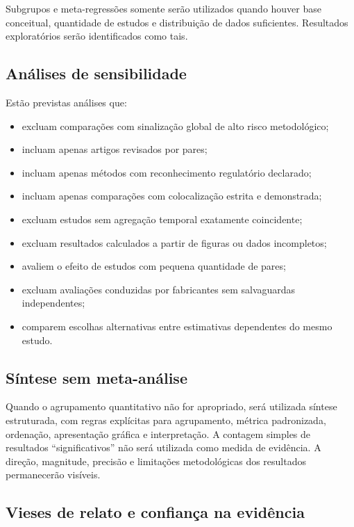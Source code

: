 \documentclass[11pt,a4paper]{article}
\begin{document}
Subgrupos e meta-regressões somente serão utilizados quando houver base conceitual,
quantidade de estudos e distribuição de dados suficientes. Resultados exploratórios
serão identificados como tais.

\subsection{Análises de sensibilidade}

Estão previstas análises que:

\begin{itemize}
  \item excluam comparações com sinalização global de alto risco metodológico;
  \item incluam apenas artigos revisados por pares;
  \item incluam apenas métodos com reconhecimento regulatório declarado;
  \item incluam apenas comparações com colocalização estrita e demonstrada;
  \item excluam estudos sem agregação temporal exatamente coincidente;
  \item excluam resultados calculados a partir de figuras ou dados incompletos;
  \item avaliem o efeito de estudos com pequena quantidade de pares;
  \item excluam avaliações conduzidas por fabricantes sem salvaguardas independentes;
  \item comparem escolhas alternativas entre estimativas dependentes do mesmo estudo.
\end{itemize}

\subsection{Síntese sem meta-análise}

Quando o agrupamento quantitativo não for apropriado, será utilizada síntese
estruturada, com regras explícitas para agrupamento, métrica padronizada, ordenação,
apresentação gráfica e interpretação. A contagem simples de resultados
``significativos'' não será utilizada como medida de evidência. A direção, magnitude,
precisão e limitações metodológicas dos resultados permanecerão visíveis.

\subsection{Vieses de relato e confiança na evidência}
\end{document}
